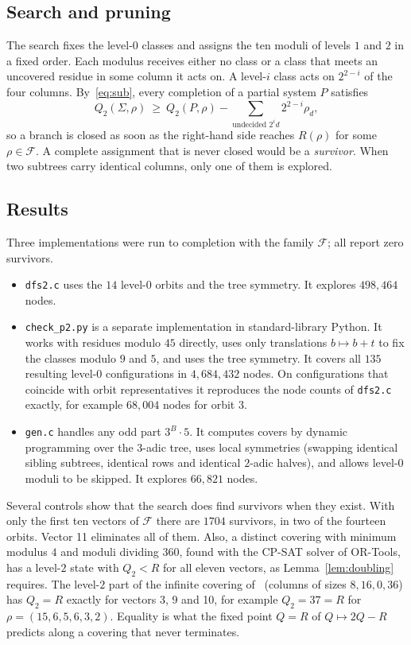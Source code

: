 \documentclass[11pt]{amsart}
\theoremstyle{definition}
\theoremstyle{remark}
\begin{document}
\subsection*{Search and pruning} The search fixes the level-$0$ classes and assigns the ten moduli of levels $1$ and $2$ in a fixed order. Each modulus receives either no class or a class that meets an uncovered residue in some column it acts on. A level-$i$ class acts on $2^{2-i}$ of the four columns. By~\eqref{eq:sub}, every completion of a partial system $P$ satisfies
\[ Q_2(\Sigma,\rho)\ \ge\ Q_2(P,\rho)-\sum_{\text{undecided } 2^id}2^{2-i}\rho_d, \]
so a branch is closed as soon as the right-hand side reaches $R(\rho)$ for some $\rho\in\mathcal F$. A complete assignment that is never closed would be a \emph{survivor}. When two subtrees carry identical columns, only one of them is explored.

\subsection*{Results} Three implementations were run to completion with the family $\mathcal F$; all report zero survivors.
\begin{itemize}
\item \texttt{dfs2.c} uses the $14$ level-$0$ orbits and the tree symmetry. It explores $498{,}464$ nodes.
\item \texttt{check\_p2.py} is a separate implementation in standard-library Python. It works with residues modulo $45$ directly, uses only translations $b\mapsto b+t$ to fix the classes modulo $9$ and $5$, and uses the tree symmetry. It covers all $135$ resulting level-$0$ configurations in $4{,}684{,}432$ nodes. On configurations that coincide with orbit representatives it reproduces the node counts of \texttt{dfs2.c} exactly, for example $68{,}004$ nodes for orbit 3.
\item \texttt{gen.c} handles any odd part $3^B\cdot5$. It computes covers by dynamic programming over the $3$-adic tree, uses local symmetries (swapping identical sibling subtrees, identical rows and identical $2$-adic halves), and allows level-$0$ moduli to be skipped. It explores $66{,}821$ nodes.
\end{itemize}
Several controls show that the search does find survivors when they exist. With only the first ten vectors of $\mathcal F$ there are $1704$ survivors, in two of the fourteen orbits. Vector 11 eliminates all of them. Also, a distinct covering with minimum modulus $4$ and moduli dividing $360$, found with the CP-SAT solver of OR-Tools, has a level-$2$ state with $Q_2<R$ for all eleven vectors, as Lemma~\ref{lem:doubling} requires. The level-$2$ part of the infinite covering of~\cite[Theorem~1.10]{HKLT2026} (columns of sizes $8,16,0,36$) has $Q_2=R$ exactly for vectors 3, 9 and 10, for example $Q_2=37=R$ for $\rho=(15,6,5,6,3,2)$. Equality is what the fixed point $Q=R$ of $Q\mapsto 2Q-R$ predicts along a covering that never terminates.
\end{document}
